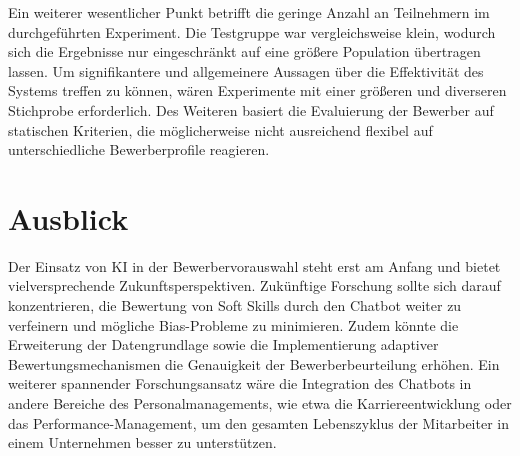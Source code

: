 Ein weiterer wesentlicher Punkt betrifft die geringe Anzahl an Teilnehmern im durchgeführten Experiment. Die Testgruppe war vergleichsweise klein, wodurch sich die Ergebnisse nur eingeschränkt auf eine größere Population übertragen lassen. Um signifikantere und allgemeinere Aussagen über die Effektivität des Systems treffen zu können, wären Experimente mit einer größeren und diverseren Stichprobe erforderlich. Des Weiteren basiert die Evaluierung der Bewerber auf statischen Kriterien, die möglicherweise nicht ausreichend flexibel auf unterschiedliche Bewerberprofile reagieren.

\section{Ausblick}

Der Einsatz von \acs{KI} in der Bewerbervorauswahl steht erst am Anfang und bietet vielversprechende Zukunftsperspektiven. Zukünftige Forschung sollte sich darauf konzentrieren, die Bewertung von Soft Skills durch den Chatbot weiter zu verfeinern und mögliche Bias-Probleme zu minimieren. Zudem könnte die Erweiterung der Datengrundlage sowie die Implementierung adaptiver Bewertungsmechanismen die Genauigkeit der Bewerberbeurteilung erhöhen. Ein weiterer spannender Forschungsansatz wäre die Integration des Chatbots in andere Bereiche des Personalmanagements, wie etwa die Karriereentwicklung oder das Performance-Management, um den gesamten Lebenszyklus der Mitarbeiter in einem Unternehmen besser zu unterstützen.